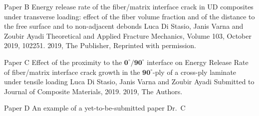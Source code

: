 \documentclass[12pt,a4paper,openright,final,twoside]{msethesis}
\begin{document}



\def\paperheader{Paper B}
\def\papertitle{Energy release rate of the fiber/matrix interface crack in UD composites under transverse loading: effect of the fiber volume fraction and of the distance to the free surface and to non-adjacent debonds}
\def\paperauthorstring{Luca Di Stasio, Janis Varna and Zoubir Ayadi}
\def\referencestring{Theoretical and Applied Fracture Mechanics, Volume 103, October 2019, 102251.}
\def\copyrightstring{2019, The Publisher, Reprinted with permission.}


\newrefsection
\makepaper
  {\paperheader}
  {\papertitle}
  {\paperauthorstring}
  {\referencestring}
  {\copyrightstring}



\def\paperheader{Paper C}
\def\papertitle{Effect of the proximity to the $\mathbf{0^{\circ}/90^{\circ}}$ interface on Energy Release Rate of fiber/matrix interface crack growth in the  $\mathbf{90^{\circ}}$-ply of a cross-ply laminate under tensile loading}
\def\paperauthorstring{Luca Di Stasio, Janis Varna and Zoubir Ayadi}
\def\referencestring{Submitted to Journal of Composite Materials, 2019.}
\def\copyrightstring{2019, The Authors.}


\makepapersubmitted
  {\paperheader}
  {\papertitle}
  {\paperauthorstring}
  {\referencestring}
  {\copyrightstring}



\def\paperheader{Paper D}
\def\papertitle{An example of a yet-to-be-submitted paper}
\def\paperauthorstring{Dr.\ C}


\makepapertobesubmitted
  {\paperheader}
  {\papertitle}
  {\paperauthorstring}

%
\end{document}
